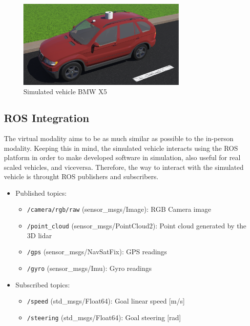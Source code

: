 \documentclass[letterpaper,12pt]{article}
\begin{document}
\begin{figure}
  \centering
  \includegraphics[width=0.75\textwidth]{Figures/Bmw.png}
  \caption{Simulated vehicle BMW X5}
  \label{fig:BmwX5}
\end{figure}

\subsection{ROS Integration}
The virtual modality aims to be as much similar as possible to the in-person modality. Keeping this in mind, the simulated vehicle interacts using the ROS platform in order to make developed software in simulation, also useful for real scaled vehicles, and viceversa. Therefore, the way to interact with the simulated vehicle is throught ROS publishers and subscribers. 

\begin{itemize}
\item Published topics:
  \begin{itemize}
  \item \texttt{/camera/rgb/raw} (sensor\_msgs/Image): RGB Camera image
  \item \texttt{/point\_cloud} (sensor\_msgs/PointCloud2): Point cloud generated by the 3D lidar
  \item \texttt{/gps} (sensor\_msgs/NavSatFix): GPS readings
  \item \texttt{/gyro} (sensor\_msgs/Imu): Gyro readings
  \end{itemize}
\item Subscribed topics:
  \begin{itemize}
  \item \texttt{/speed} (std\_msgs/Float64): Goal linear speed [m/s]
  \item \texttt{/steering} (std\_msgs/Float64): Goal steering [rad]
  \end{itemize}
\end{itemize}
\end{document}
